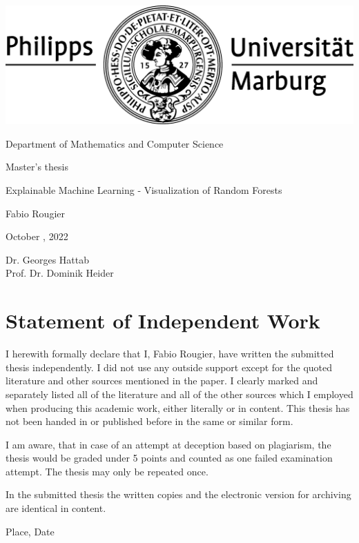 \documentclass[a4paper, 12pt]{article}
\begin{document}
\begin{titlepage}
    \begin{center}
        \includegraphics[width=0.5\linewidth]{resources/logo.jpg}
        \vfill

        \large{Department of Mathematics and Computer Science}
        \vfill

        \large{Master's thesis}
        \vfill

        \huge{Explainable Machine Learning - Visualization of Random Forests}
        \vfill

        \large
        Fabio Rougier
        \vfill

        October , 2022
        \vfill

        Dr. Georges Hattab
        \\
        Prof. Dr. Dominik Heider

    \end{center}
\end{titlepage}

\clearpage
\section{Statement of Independent Work}
I herewith formally declare that I, Fabio Rougier, have written the submitted thesis independently.
I did not use any outside support except for the quoted literature and other sources mentioned in the paper.
I clearly marked and separately listed all of the literature and all of the other sources which I employed when
producing this academic work, either literally or in content. This thesis has not been handed in or published before
in the same or similar form.
\par
I am aware, that in case of an attempt at deception based on plagiarism, the thesis would be graded under 5 points
and counted as one failed examination attempt. The thesis may only be repeated once.
\par
In the submitted thesis the written copies and the electronic version for archiving are identical in content.
\vspace{40pt}

\noindent
Place, Date
\vspace{60pt}
\end{document}
